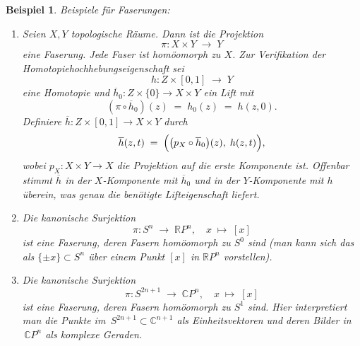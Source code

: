 \documentclass[12pt, hidelinks]{article}
\numberwithin{conj}{section}
\newtheorem{example}[conj]{Beispiel}
\begin{document}
        \begin{example}
            \label{examplesFibrations}
            Beispiele für Faserungen:
            \begin{enumerate}[nolistsep]
                \item Seien \(X,Y\) topologische Räume. Dann ist die Projektion
                      \[
                        \pi : X \times Y \;\longrightarrow\; Y
                      \]
                      eine Faserung. Jede Faser ist homöomorph zu \(X\). Zur Verifikation der Homotopiehochhebungseigenschaft sei
                      \[
                        h : Z \times [0,1] \;\longrightarrow\; Y
                      \]
                      eine Homotopie und \(\overline{h}_0 : Z \times \{0\} \to X \times Y\) ein Lift mit 
                      \[
                        (\pi \circ \overline{h}_0)(z) \;=\; h_0(z) \;=\; h(z,0).
                      \]
                      Definiere \(\overline{h} : Z \times [0,1] \to X \times Y\) durch
                      \[
                        \overline{h}(z,t)
                        \;=\;
                        \Bigl(\bigl(p_X \circ \overline{h}_0\bigr)(z),\; h(z,t)\Bigr),
                      \]
                      wobei \(p_X : X \times Y \to X\) die Projektion auf die erste Komponente ist. Offenbar stimmt \(\overline{h}\) in der \(X\)-Komponente mit \(\overline{h}_0\) und in der \(Y\)-Komponente mit \(h\) überein, was genau die benötigte Lifteigenschaft liefert.
                      
                \item Die kanonische Surjektion 
                      \[
                        \pi : S^n \;\longrightarrow\; \mathbb{R}P^n,\quad x \;\mapsto\; [x]
                      \]
                      ist eine Faserung, deren Fasern homöomorph zu \(S^0\) sind (man kann sich das als \(\{\pm x\}\subset S^n\) über einem Punkt \([x]\) in \(\mathbb{R}P^n\) vorstellen).
                      
                \item Die kanonische Surjektion 
                      \[
                        \pi : S^{2n+1} \;\longrightarrow\; \mathbb{C}P^n,\quad x \;\mapsto\; [x]
                      \]
                      ist eine Faserung, deren Fasern homöomorph zu \(S^1\) sind. Hier interpretiert man die Punkte im \(\,S^{2n+1}\subset \mathbb{C}^{n+1}\) als Einheitsvektoren und deren Bilder in \(\,\mathbb{C}P^n\) als komplexe Geraden.
            \end{enumerate}
        \end{example}
        
\end{document}
